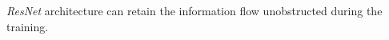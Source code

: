 \documentclass[10pt,twocolumn,letterpaper]{article}
\newcommand{\architecture}[1]{\emph{#1}}
\begin{document}
\architecture{ResNet} architecture can retain the information flow unobstructed during the training.%
\end{document}
